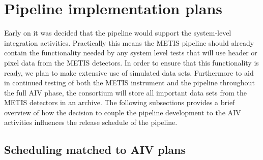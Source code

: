 \documentclass[a4paper]{spie}  %
\begin{document}




\section{Pipeline implementation plans}
\label{sec:imp}

Early on it was decided that the pipeline would support the system-level integration activities.
Practically this means the METIS pipeline should already contain the functionality needed by any system level tests that will use header or pixel data from the METIS detectors.
In order to ensure that this functionality is ready, we plan to make extensive use of simulated data sets. 
Furthermore to aid in continued testing of both the METIS instrument and the pipeline throughout the full AIV phase, the consortium will store all important data sets from the METIS detectors in an archive.
The following subsections provides a brief overview of how the decision to couple the pipeline development to the AIV activities influences the release schedule of the pipeline.

\subsection{Scheduling matched to AIV plans}
\label{subsec:imp_aiv}
\end{document}
